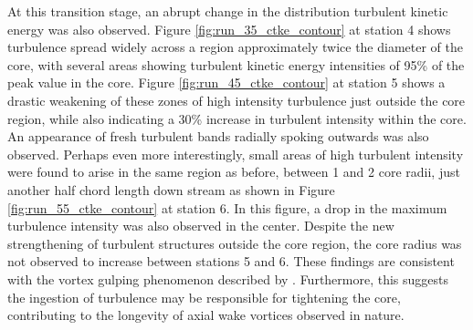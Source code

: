 


At this transition stage, an abrupt change in 
the distribution turbulent kinetic energy was also observed. Figure 
\ref{fig:run_35_ctke_contour} at station 4 shows turbulence spread widely 
across a region approximately twice the diameter of the core, with several 
areas showing turbulent kinetic energy intensities of 95\% of the peak value in 
the core. Figure \ref{fig:run_45_ctke_contour} at station 5 shows a drastic 
weakening of these zones of high intensity turbulence just outside the core 
region, while also indicating a 30\% increase in turbulent intensity within the 
core. An appearance of fresh turbulent bands radially spoking outwards was also 
observed. Perhaps even more interestingly, small areas of high turbulent 
intensity were found to arise in the same region as before, between 1 and 2 
core radii, just another half chord length down stream as shown in Figure 
\ref{fig:run_55_ctke_contour} at station 6. In this figure, a drop 
in the maximum turbulence intensity was also observed in the center. Despite 
the new strengthening of turbulent structures outside the core region, the core 
radius was not observed to increase between stations 5 and 6. These findings 
are consistent with the vortex gulping phenomenon described by 
\cite{bandyopadhyay1991}. Furthermore, this suggests the ingestion of 
turbulence may be responsible for tightening the core, contributing to the 
longevity of axial wake vortices observed in nature.









